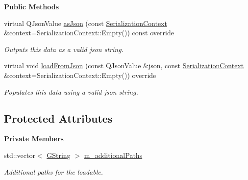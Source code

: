 \begin{Indent}\textbf{ Public Methods}\par
\begin{DoxyCompactItemize}
\item 
\mbox{\label{classrev_1_1_distributed_loadable_a1805ff34c7befcb7901960e02a08d419}} 
virtual Q\+Json\+Value \mbox{\hyperlink{classrev_1_1_distributed_loadable_a1805ff34c7befcb7901960e02a08d419}{as\+Json}} (const \mbox{\hyperlink{structrev_1_1_serialization_context}{Serialization\+Context}} \&context=Serialization\+Context\+::\+Empty()) const override
\begin{DoxyCompactList}\small\item\em Outputs this data as a valid json string. \end{DoxyCompactList}\item 
\mbox{\label{classrev_1_1_distributed_loadable_ad28d3797cafde5545c65eb3c0d3b88c4}} 
virtual void \mbox{\hyperlink{classrev_1_1_distributed_loadable_ad28d3797cafde5545c65eb3c0d3b88c4}{load\+From\+Json}} (const Q\+Json\+Value \&json, const \mbox{\hyperlink{structrev_1_1_serialization_context}{Serialization\+Context}} \&context=Serialization\+Context\+::\+Empty()) override
\begin{DoxyCompactList}\small\item\em Populates this data using a valid json string. \end{DoxyCompactList}\end{DoxyCompactItemize}
\end{Indent}
\subsection*{Protected Attributes}
\begin{Indent}\textbf{ Private Members}\par
\begin{DoxyCompactItemize}
\item 
\mbox{\label{classrev_1_1_distributed_loadable_a5ec0b8ab995283937fcf03eda39010c6}} 
std\+::vector$<$ \mbox{\hyperlink{classrev_1_1_g_string}{G\+String}} $>$ \mbox{\hyperlink{classrev_1_1_distributed_loadable_a5ec0b8ab995283937fcf03eda39010c6}{m\+\_\+additional\+Paths}}
\begin{DoxyCompactList}\small\item\em Additional paths for the loadable. \end{DoxyCompactList}\end{DoxyCompactItemize}
\end{Indent}
